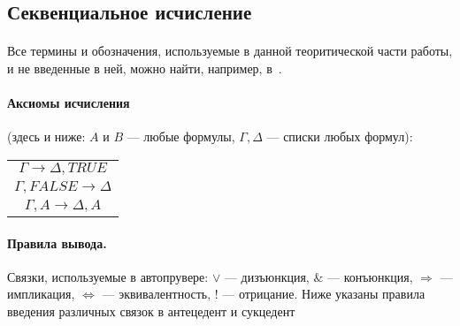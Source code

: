 \documentclass{cw1}
\begin{document}
\subsection{Секвенциальное исчисление}
\paragraph{}
Все термины и обозначения, используемые в данной теоритической части работы, и не введенные в ней,
можно найти, например, в~\cite{gerasimov, klini}.

\paragraph{Аксиомы исчисления}
(здесь и ниже: $A$ и $B$ --- любые формулы,  $\Gamma, \Delta$ --- списки любых формул):\\
\begin{center}
  \begin{tabular}{ c }
  $ \Gamma \rightarrow  \Delta, T \! R U \! E$ \\
  $ \Gamma, F\!ALS\!E \rightarrow  \Delta $ \\
  $ \Gamma, A \rightarrow  \Delta, A $ \\
  \end{tabular}
\end{center}

\paragraph{Правила вывода.}
Связки, используемые в автопрувере: $\vee$ --- дизъюнкция, $\&$ --- конъюнкция, $\Rightarrow$ --- импликация,
$\Leftrightarrow$ --- эквивалентность, ! --- отрицание. Ниже указаны правила введения различных связок в
антецедент и сукцедент
\end{document}
